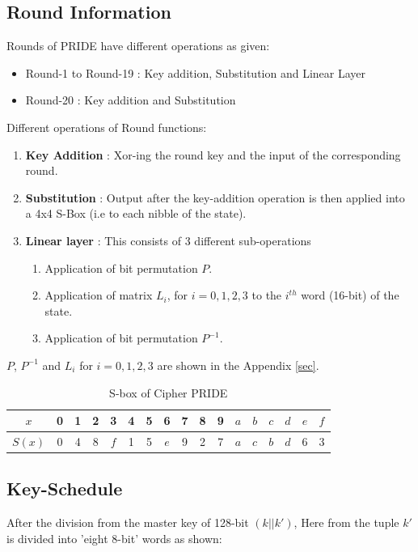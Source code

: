 \documentclass{transcrypto}
\begin{document}
	\subsection{Round Information}
	Rounds of PRIDE have different operations as given:
	\begin{itemize}
		\item Round-1 to Round-19 : Key addition, Substitution and Linear Layer
		\item Round-20 : Key addition and Substitution
	\end{itemize}
	Different operations of Round functions:
	\begin{enumerate}
		\item \textbf{Key Addition} : Xor-ing the round key and the input of the corresponding round.
		\item \textbf{Substitution} : Output after the key-addition operation is then applied into a 4x4 S-Box (i.e to each nibble of the state).
		\item \textbf{Linear layer} : This consists of 3 different sub-operations
		\begin{enumerate}
			\item Application of bit permutation $P$.
			\item Application of matrix $ L_i $, for $ i = 0,1,2,3 $ to the $ i^{th} $ word (16-bit) of the state.
			\item Application of bit permutation $ P^{-1} $.
		\end{enumerate}
	\end{enumerate}
	$P$, $P^{-1}$ and $L_i$ for $i=0,1,2,3$ are shown in the Appendix \ref{sec}.
	\begin{table}[H]
		\centering
		\begin{tabular}{c|c|c|c|c|c|c|c|c|c|c|c|c|c|c|c|c}
			\hline
			$x$ & 0 & 1 & 2 & 3 & 4 & 5 & 6 & 7 & 8 & 9 & $ a $ & $ b $ & $ c $ & $ d $ & $ e $ & $ f $ \\ \hline
			$S(x)$ & 0 & 4 & 8 & $ f $ & 1 & 5 & $ e $ & 9 & 2 & 7 & $ a $ & $ c $ & $ b $ & $ d $ & 6 & 3 \\ \hline
		\end{tabular}
		\caption{S-box of Cipher PRIDE}
	\end{table}
	\subsection{Key-Schedule}
		After the division from the master key of 128-bit $ (k||k') $, Here from the tuple $ k' $ is divided into 'eight 8-bit' words as shown:
		
\end{document}
